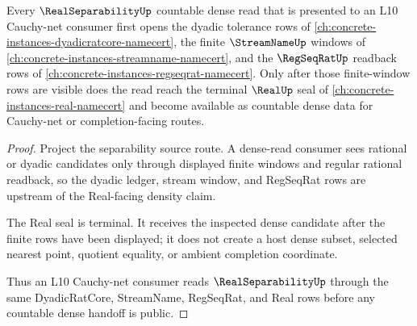 \begin{theorem}
\label{thm:real-separability-l10-cauchy-net-dependency}
Every $\RealSeparabilityUp$ countable dense read that is presented to an L10 Cauchy-net consumer first opens the dyadic tolerance rows of \autoref{ch:concrete-instances-dyadicratcore-namecert}, the finite $\StreamNameUp$ windows of \autoref{ch:concrete-instances-streamname-namecert}, and the $\RegSeqRatUp$ readback rows of \autoref{ch:concrete-instances-regseqrat-namecert}. Only after those finite-window rows are visible does the read reach the terminal $\RealUp$ seal of \autoref{ch:concrete-instances-real-namecert} and become available as countable dense data for Cauchy-net or completion-facing routes.
\end{theorem}
\begin{proof}
Project the separability source route. A dense-read consumer sees rational or dyadic candidates only through displayed finite windows and regular rational readback, so the dyadic ledger, stream window, and RegSeqRat rows are upstream of the Real-facing density claim.

The Real seal is terminal. It receives the inspected dense candidate after the finite rows have been displayed; it does not create a host dense subset, selected nearest point, quotient equality, or ambient completion coordinate.

Thus an L10 Cauchy-net consumer reads $\RealSeparabilityUp$ through the same DyadicRatCore, StreamName, RegSeqRat, and Real rows before any countable dense handoff is public.
\end{proof}
